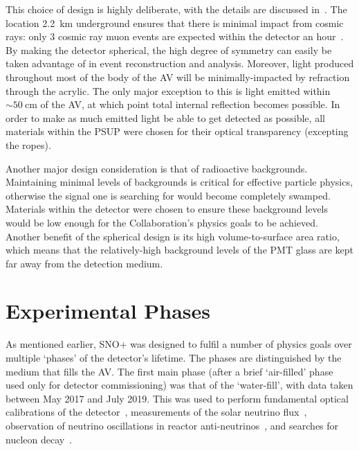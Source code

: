 This choice of design is highly deliberate, with the details are discussed in~\cite{albanese_sno_2021}. 
The location \SI{2.2}{\km} underground ensures that there is minimal impact from cosmic rays: only 3 cosmic ray muon events are expected within the detector an hour~\cite{}. %
By making the detector spherical, the high degree of symmetry can easily be taken advantage of in event reconstruction and analysis. Moreover, light produced throughout most of the body of the AV will be minimally-impacted by refraction through the acrylic. The only major exception to this is light emitted within $\sim\SI{50}{\cm}$ of the AV, at which point total internal reflection becomes possible. In order to make as much emitted light be able to get detected as possible, all materials within the PSUP were chosen for their optical transparency (excepting the ropes).

Another major design consideration is that of radioactive backgrounds. Maintaining minimal levels of backgrounds is critical for effective particle physics, otherwise the signal one is searching for would become completely swamped. Materials within the detector were chosen to ensure these background levels would be low enough for the Collaboration's physics goals to be achieved. Another benefit of the spherical design is its high volume-to-surface area ratio, which means that the relatively-high background levels of the PMT glass are kept far away from the detection medium.

\section{Experimental Phases}
As mentioned earlier, SNO+ was designed to fulfil a number of physics goals over multiple `phases' of the detector's lifetime. The phases are distinguished by the medium that fills the AV. The first main phase (after a brief `air-filled' phase used only for detector commissioning) was that of the `water-fill', with data taken between May 2017 and July 2019. This was used to perform fundamental optical calibrations of the detector~\cite{}, %
measurements of the solar neutrino flux~\cite{}, %
observation of neutrino oscillations in reactor anti-neutrinos~\cite{}, %
and searches for nucleon decay~\cite{}. %

